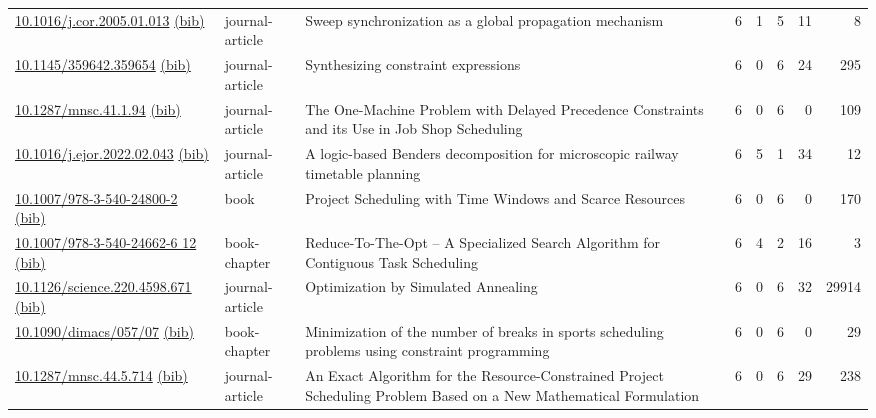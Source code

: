 {\begin{longtable}{p{5cm}lp{11cm}rrrrr}
\href{http://dx.doi.org/10.1016/j.cor.2005.01.013}{10.1016/j.cor.2005.01.013} \href{https://www.doi2bib.org/bib/10.1016/j.cor.2005.01.013}{(bib)} & journal-article & Sweep synchronization as a global propagation mechanism & 6 & 1 & 5 & 11 & 8 \\
\href{http://dx.doi.org/10.1145/359642.359654}{10.1145/359642.359654} \href{https://www.doi2bib.org/bib/10.1145/359642.359654}{(bib)} & journal-article & Synthesizing constraint expressions & 6 & 0 & 6 & 24 & 295 \\
\href{http://dx.doi.org/10.1287/mnsc.41.1.94}{10.1287/mnsc.41.1.94} \href{https://www.doi2bib.org/bib/10.1287/mnsc.41.1.94}{(bib)} & journal-article & The One-Machine Problem with Delayed Precedence Constraints and its Use in Job Shop Scheduling & 6 & 0 & 6 & 0 & 109 \\
\href{http://dx.doi.org/10.1016/j.ejor.2022.02.043}{10.1016/j.ejor.2022.02.043} \href{https://www.doi2bib.org/bib/10.1016/j.ejor.2022.02.043}{(bib)} & journal-article & A logic-based Benders decomposition for microscopic railway timetable planning & 6 & 5 & 1 & 34 & 12 \\
\href{http://dx.doi.org/10.1007/978-3-540-24800-2}{10.1007/978-3-540-24800-2} \href{https://www.doi2bib.org/bib/10.1007/978-3-540-24800-2}{(bib)} & book & Project Scheduling with Time Windows and Scarce Resources & 6 & 0 & 6 & 0 & 170 \\
\href{http://dx.doi.org/10.1007/978-3-540-24662-6_12}{10.1007/978-3-540-24662-6 12} \href{https://www.doi2bib.org/bib/10.1007/978-3-540-24662-6_12}{(bib)} & book-chapter & Reduce-To-The-Opt – A Specialized Search Algorithm for Contiguous Task Scheduling & 6 & 4 & 2 & 16 & 3 \\
\href{http://dx.doi.org/10.1126/science.220.4598.671}{10.1126/science.220.4598.671} \href{https://www.doi2bib.org/bib/10.1126/science.220.4598.671}{(bib)} & journal-article & Optimization by Simulated Annealing & 6 & 0 & 6 & 32 & 29914 \\
\href{http://dx.doi.org/10.1090/dimacs/057/07}{10.1090/dimacs/057/07} \href{https://www.doi2bib.org/bib/10.1090/dimacs/057/07}{(bib)} & book-chapter & Minimization of the number of breaks in
                    sports scheduling problems using constraint
                    programming & 6 & 0 & 6 & 0 & 29 \\
\href{http://dx.doi.org/10.1287/mnsc.44.5.714}{10.1287/mnsc.44.5.714} \href{https://www.doi2bib.org/bib/10.1287/mnsc.44.5.714}{(bib)} & journal-article & An Exact Algorithm for the Resource-Constrained Project Scheduling Problem Based on a New Mathematical Formulation & 6 & 0 & 6 & 29 & 238 \\

\end{longtable}}
